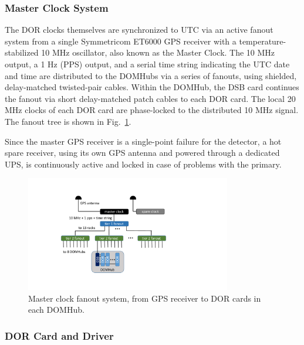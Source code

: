
\subsubsection{\label{sect:online:master_clock}Master Clock System}

The DOR clocks themselves are synchronized to UTC via an active fanout
system from a single Symmetricom ET6000 GPS receiver with a
temperature-stabilized 10 MHz oscillator, also known as the Master Clock.
The 10 MHz output, a 1 Hz (PPS) output, and a serial time string indicating
the UTC date and time are distributed 
to the DOMHubs via a series of fanouts, using shielded, delay-matched
twisted-pair cables.  Within the DOMHub, the DSB card continues the fanout
via short delay-matched patch cables to each DOR card.  The local 20 MHz
clocks of each DOR card are phase-locked to the distributed 10 MHz signal.
The fanout tree is shown in Fig.~\ref{fig:clock_fanout}.

Since the master GPS receiver is a single-point failure for the detector, a
hot spare receiver, using its own GPS antenna and powered through a
dedicated UPS, is continuously active and locked in case of problems with
the primary.

\begin{figure}[!h]
 \centering
 \includegraphics[width=0.8\textwidth]{graphics/online/data_readout/clock_fanout.pdf}
 \caption{Master clock fanout system, from GPS receiver to DOR cards in
   each DOMHub.}
 \label{fig:clock_fanout}
\end{figure}


\subsubsection{DOR Card and Driver}

